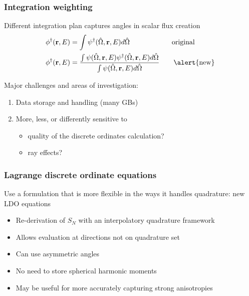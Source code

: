 \documentclass[xcolor=x11names,compress, handout]{beamer}
\renewcommand{\(}{\begin{columns}}
\renewcommand{\)}{\end{columns}}
\newcommand{\<}[1]{\begin{column}{#1}}
\renewcommand{\>}{\end{column}}
\newcommand{\vOmega}{\ensuremath{\hat{\Omega}}}
\newcommand{\ve}[1]{\ensuremath{\mathbf{#1}}}
\begin{document}
\begin{frame}[fragile]
  \frametitle{Integration weighting}

    Different integration plan captures angles in scalar flux creation	
	\begin{align*}
		\phi^{\dagger}(\ve{r},E) &= \int \psi^{\dagger}(\vOmega, 
		\ve{r},E) d\vOmega \qquad  \qquad \qquad \text{original}\\
		\phi^{\dagger}(\ve{r},E) &= \frac{\int \psi(\vOmega, \ve{r},E)
		 \psi^{\dagger}(\vOmega, \ve{r},E) d\vOmega}{\int \psi(\vOmega, 
		 \ve{r},E)  d\vOmega} \qquad \text{\alert{new}}
	\end{align*}

    \pause
    Major challenges and areas of investigation:
	\begin{enumerate}
	\item Data storage and handling (many GBs)
	\item More, less, or differently sensitive to 
	  \begin{itemize}
	  \item quality of the discrete ordinates calculation?
	  \item ray effects?
	  \end{itemize}
	\end{enumerate}

\end{frame}

\begin{frame}[fragile]
  \frametitle{Lagrange discrete ordinate equations}

    Use a formulation that is more flexible in the ways 
	it handles quadrature: new LDO equations \cite{Ahrens2014}
	\vspace*{1 em}
	
	\begin{itemize}
	\item Re-derivation of $S_N$ with an \alert{interpolatory quadrature framework}
	\item Allows evaluation at directions not on quadrature set
	\item Can use \alert{asymmetric angles}
	\item No need to store spherical harmonic moments
	\item May be useful for more accurately capturing strong anisotropies
	\end{itemize}

\end{frame}
\end{document}
